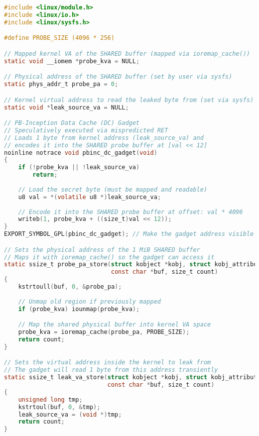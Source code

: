 \documentclass[11pt,a4paper]{article}
\begin{document}
\begin{lstlisting}[language=C, caption={PB‑Inception kernel gadget (LKM): sysfs plumbing (\texttt{probe}, \texttt{leak}, \texttt{gaddr}), mapping of a 1\,MiB shared probe via \texttt{ioremap\_cache()}, and \texttt{pbinc\_dc\_gadget()} which transiently reads one kernel byte and encodes it at offset \texttt{(val << 12)}.}, label={lst:pbinc-gadget}]
#include <linux/module.h>
#include <linux/io.h>
#include <linux/sysfs.h>

#define PROBE_SIZE (4096 * 256)

// Mapped kernel VA of the SHARED buffer (mapped via ioremap_cache())
static void __iomem *probe_kva = NULL;

// Physical address of the SHARED buffer (set by user via sysfs)
static phys_addr_t probe_pa = 0;

// Kernel virtual address to read the leaked byte from (set via sysfs)
static void *leak_source_va = NULL;

// PB-Inception Data Cache (DC) Gadget
// Speculatively executed via mispredicted RET
// Loads 1 byte from kernel address (leak_source_va) and
// encodes it into the SHARED probe buffer at [val << 12]
noinline notrace void pbinc_dc_gadget(void)
{
    if (!probe_kva || !leak_source_va)
        return;
    
    // Load the secret byte (must be mapped and readable)
    u8 val = *(volatile u8 *)leak_source_va;
    
    // Encode it into the SHARED probe buffer at offset: val * 4096
    writeb(1, probe_kva + ((size_t)val << 12));
}
EXPORT_SYMBOL_GPL(pbinc_dc_gadget); // Make the gadget address visible via kallsyms/sysfs

// Sets the physical address of the 1 MiB SHARED buffer
// Maps it with ioremap_cache() so the gadget can access it
static ssize_t probe_pa_store(struct kobject *kobj, struct kobj_attribute *attr,
                              const char *buf, size_t count)
{
    kstrtoull(buf, 0, &probe_pa);
    
    // Unmap old region if previously mapped
    if (probe_kva) iounmap(probe_kva);

    // Map the shared physical buffer into kernel VA space
    probe_kva = ioremap_cache(probe_pa, PROBE_SIZE);
    return count;
}

// Sets the virtual address inside the kernel to leak from
// The gadget will read 1 byte from this address transiently
static ssize_t leak_va_store(struct kobject *kobj, struct kobj_attribute *attr,
                             const char *buf, size_t count)
{
    unsigned long tmp;
    kstrtoul(buf, 0, &tmp);
    leak_source_va = (void *)tmp;
    return count;
}


\end{lstlisting}
\end{document}
